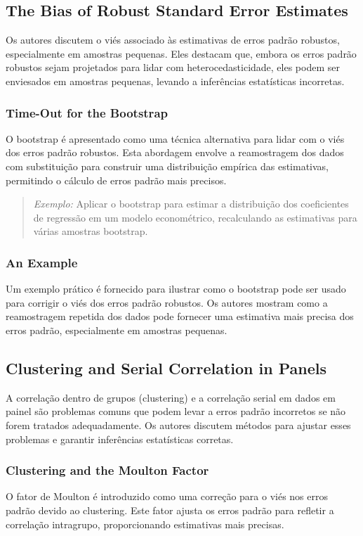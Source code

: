 \documentclass[a4paper,12pt]{article}[abntex2]
\begin{document}
\subsection{The Bias of Robust Standard Error Estimates}
Os autores discutem o viés associado às estimativas de erros padrão robustos, especialmente em amostras pequenas. Eles destacam que, embora os erros padrão robustos sejam projetados para lidar com heterocedasticidade, eles podem ser enviesados em amostras pequenas, levando a inferências estatísticas incorretas.

\subsubsection{Time-Out for the Bootstrap}
O bootstrap é apresentado como uma técnica alternativa para lidar com o viés dos erros padrão robustos. Esta abordagem envolve a reamostragem dos dados com substituição para construir uma distribuição empírica das estimativas, permitindo o cálculo de erros padrão mais precisos.

\begin{quote}
\textit{Exemplo:} Aplicar o bootstrap para estimar a distribuição dos coeficientes de regressão em um modelo econométrico, recalculando as estimativas para várias amostras bootstrap.
\end{quote}

\subsubsection{An Example}
Um exemplo prático é fornecido para ilustrar como o bootstrap pode ser usado para corrigir o viés dos erros padrão robustos. Os autores mostram como a reamostragem repetida dos dados pode fornecer uma estimativa mais precisa dos erros padrão, especialmente em amostras pequenas.

\subsection{Clustering and Serial Correlation in Panels}
A correlação dentro de grupos (clustering) e a correlação serial em dados em painel são problemas comuns que podem levar a erros padrão incorretos se não forem tratados adequadamente. Os autores discutem métodos para ajustar esses problemas e garantir inferências estatísticas corretas.

\subsubsection{Clustering and the Moulton Factor}
O fator de Moulton é introduzido como uma correção para o viés nos erros padrão devido ao clustering. Este fator ajusta os erros padrão para refletir a correlação intragrupo, proporcionando estimativas mais precisas.
\end{document}
